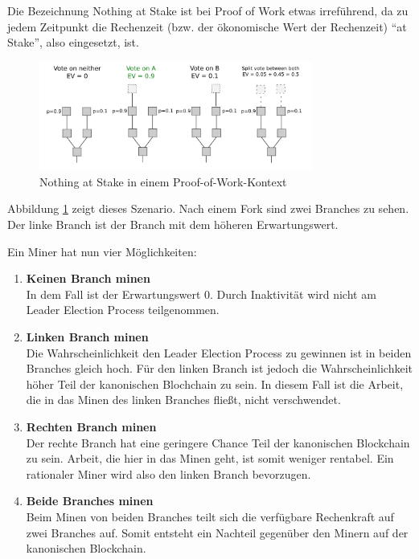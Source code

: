 Die Bezeichnung Nothing at Stake ist bei Proof of Work etwas irreführend, da zu jedem Zeitpunkt die Rechenzeit (bzw. der ökonomische Wert der Rechenzeit) "`at Stake"', also eingesetzt, ist.

\begin{figure}[htb] 
	\centerline{\includegraphics*[width=0.8\textwidth]{img/ns_pow}}
\caption{Nothing at Stake in einem Proof-of-Work-Kontext\protect\footnotemark}
\label{fig:ns_pow}
\end{figure}


Abbildung \ref{fig:ns_pow} zeigt dieses Szenario. Nach einem Fork sind zwei Branches zu sehen. Der linke Branch ist der Branch mit dem höheren Erwartungswert.

Ein Miner hat nun vier Möglichkeiten:

\begin{enumerate}
    \item \textbf{Keinen Branch minen}\\
    In dem Fall ist der Erwartungswert 0. Durch Inaktivität wird nicht am Leader Election Process teilgenommen.
    
    \item \textbf{Linken Branch minen}\\
    Die Wahrscheinlichkeit den Leader Election Process zu gewinnen ist in beiden Branches gleich hoch. Für den linken Branch ist jedoch die Wahrscheinlichkeit höher Teil der kanonischen Blochchain zu sein. In diesem Fall ist die Arbeit, die in das Minen des linken Branches fließt, nicht verschwendet.
    
    \item \textbf{Rechten Branch minen}\\
    Der rechte Branch hat eine geringere Chance Teil der kanonischen Blockchain zu sein. Arbeit, die hier in das Minen geht, ist somit weniger rentabel. Ein rationaler Miner wird also den linken Branch bevorzugen.
    
    \item \textbf{Beide Branches minen}\\
    Beim Minen von beiden Branches teilt sich die verfügbare Rechenkraft auf zwei Branches auf. Somit entsteht ein Nachteil gegenüber den Minern auf der kanonischen Blockchain.
\end{enumerate}

